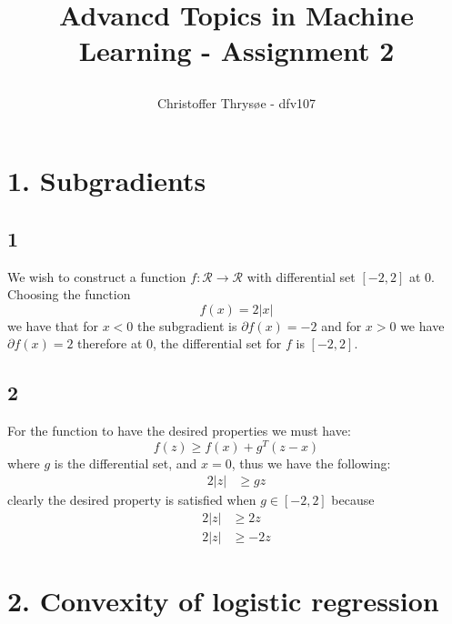 \documentclass{article}
\title{
\vspace{1in}
\textmd{\textbf{Advancd Topics in Machine Learning - Assignment 2}} \\
\author{Christoffer Thrysøe - dfv107}
}
\begin{document}
\maketitle
{}
\section{1. Subgradients}
\subsection{1}
We wish to construct a function $f : \mathcal{R} \rightarrow \mathcal{R}$ with differential set $[-2,2]$ at $0$. \\Choosing the function
\begin{equation}
f(x) = 2 |x|
\end{equation}
we have that for $x<0$ the subgradient is $\partial f(x) = -2$ and for $x > 0$ we have $\partial f(x) = 2$ therefore at 0, the differential set for $f$ is $[-2,2]$. 
\subsection{2}
For the function to have the desired properties we must have:
\begin{equation}
f(z) \geq f(x) + g^T (z-x)
\end{equation}
where $g$ is the differential set, and $x=0$, thus we have the following:
\begin{align}
2|z| &\geq gz
\end{align}
clearly the desired property is satisfied when $g \in [-2,2]$ because
\begin{align}
2|z| &\geq 2z \\
2|z| &\geq -2z
\end{align}
\section{2. Convexity of logistic regression}
\end{document}
